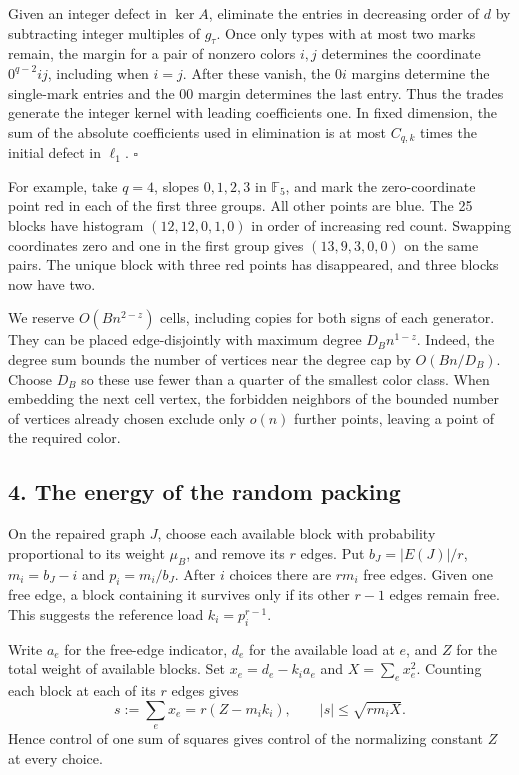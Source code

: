 \documentclass[english,11pt,a4paper]{article}
\begin{document}
Given an integer defect in \(\ker A\), eliminate the entries in decreasing order of \(d\) by subtracting integer multiples of \(g_\tau\). Once only types with at most two marks remain, the margin for a pair of nonzero colors \(i,j\) determines the coordinate \(0^{q-2}ij\), including when \(i=j\). After these vanish, the \(0i\) margins determine the single-mark entries and the \(00\) margin determines the last entry. Thus the trades generate the integer kernel with leading coefficients one. In fixed dimension, the sum of the absolute coefficients used in elimination is at most \(C_{q,k}\) times the initial defect in \(\ell_1\). \(\square\)

For example, take \(q=4\), slopes \(0,1,2,3\) in \(\mathbb F_5\), and mark the zero-coordinate point red in each of the first three groups. All other points are blue. The 25 blocks have histogram \((12,12,0,1,0)\) in order of increasing red count. Swapping coordinates zero and one in the first group gives \((13,9,3,0,0)\) on the same pairs. The unique block with three red points has disappeared, and three blocks now have two.

We reserve \(O(Bn^{2-z})\) cells, including copies for both signs of each generator. They can be placed edge-disjointly with maximum degree \(D_B n^{1-z}\). Indeed, the degree sum bounds the number of vertices near the degree cap by \(O(Bn/D_B)\). Choose \(D_B\) so these use fewer than a quarter of the smallest color class. When embedding the next cell vertex, the forbidden neighbors of the bounded number of vertices already chosen exclude only \(o(n)\) further points, leaving a point of the required color.

\subsection{4. The energy of the random packing}\label{the-energy-of-the-random-packing}

On the repaired graph \(J\), choose each available block with probability proportional to its weight \(\mu_B\), and remove its \(r\) edges. Put \(b_J=|E(J)|/r\), \(m_i=b_J-i\) and \(p_i=m_i/b_J\). After \(i\) choices there are \(rm_i\) free edges. Given one free edge, a block containing it survives only if its other \(r-1\) edges remain free. This suggests the reference load \(k_i=p_i^{r-1}\).

Write \(a_e\) for the free-edge indicator, \(d_e\) for the available load at \(e\), and \(Z\) for the total weight of available blocks. Set \(x_e=d_e-k_i a_e\) and \(X=\sum_e x_e^2\). Counting each block at each of its \(r\) edges gives \[s:=\sum_e x_e=r(Z-m_i k_i),\qquad |s|\le\sqrt{rm_i X}.\] Hence control of one sum of squares gives control of the normalizing constant \(Z\) at every choice.
\end{document}

